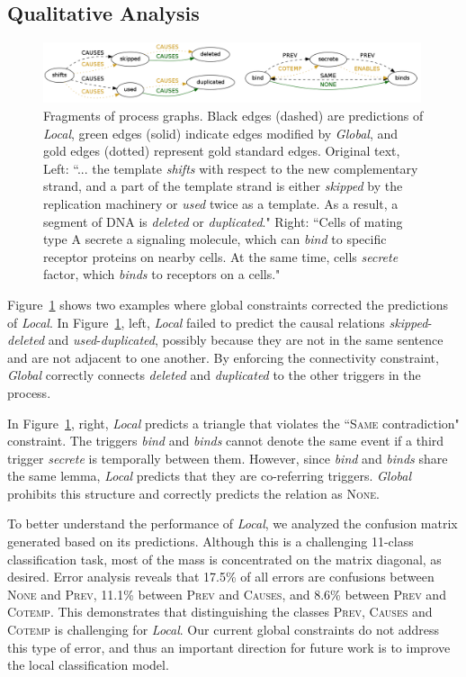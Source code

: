 \subsection{Qualitative Analysis} \label{subsec:analysis}

\begin{figure}[t]
\centering
\includegraphics[width=0.99\textwidth]{figures/example.png} 
\caption{Fragments of process graphs. Black edges (dashed) are predictions of \emph{Local}, green edges (solid) indicate edges modified by \emph{Global}, and gold edges (dotted) represent gold standard edges. Original text, Left: ``... the template \emph{shifts} with respect to the new complementary strand, and a part of the template strand is either \emph{skipped} by the replication machinery or \emph{used} twice as a template.
As a result, a segment of DNA is \emph{deleted} or \emph{duplicated}." Right: ``Cells of mating type A secrete a signaling molecule, which can \emph{bind} to specific receptor proteins on nearby cells. At the same time, cells \emph{secrete} factor, which \emph{binds} to receptors on a cells."}
\label{fig:graph}
\end{figure}

Figure~\ref{fig:graph} shows two examples where global constraints corrected the predictions of \emph{Local}. In Figure~\ref{fig:graph}, left, \emph{Local} failed to predict the causal relations \emph{skipped}-\emph{deleted} and \emph{used}-\emph{duplicated}, possibly because they are not in the same sentence and are not adjacent to one another. By enforcing the connectivity constraint, \emph{Global} correctly connects \emph{deleted} and \emph{duplicated} to the other triggers in the process.

In Figure~\ref{fig:graph}, right, \emph{Local} predicts a triangle that violates the ``\textsc{Same} contradiction" constraint. The triggers \emph{bind} and \emph{binds} cannot denote the same event if a third trigger \emph{secrete} is temporally between them. However, since \emph{bind} and \emph{binds} share the same lemma, \emph{Local} predicts that they are co-referring triggers. \emph{Global} prohibits this structure and correctly predicts the relation as \textsc{None}.

To better understand the performance of \emph{Local}, we analyzed the confusion matrix generated based on its predictions. Although this is a challenging 11-class classification task, most of the mass is concentrated on the matrix diagonal, as desired. Error analysis reveals that 17.5\% of all errors are confusions between \textsc{None} and \textsc{Prev}, 11.1\% between \textsc{Prev} and \textsc{Causes}, and 8.6\% between \textsc{Prev} and \textsc{Cotemp}. This demonstrates that distinguishing the classes \textsc{Prev}, \textsc{Causes} and \textsc{Cotemp} is challenging for \emph{Local}. Our current global constraints do not address this type of error, and thus an important direction for future work is to improve the local classification model. 

